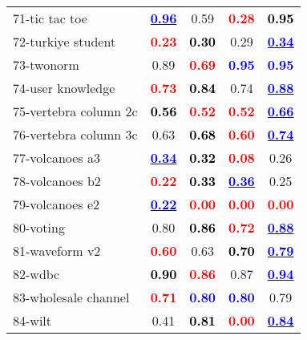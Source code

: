 \begin{table}
\begin{center}
\begin{tabular}{lc|c|c|c}
71-tic tac toe & \underline{\textcolor{blue}{\textbf{  0.96}}} &   0.59 & \textcolor{red}{\textbf{  0.28}} & \textcolor{black}{\textbf{  0.95}} \\
72-turkiye student & \textcolor{red}{\textbf{  0.23}} & \textcolor{black}{\textbf{  0.30}} &   0.29 & \underline{\textcolor{blue}{\textbf{  0.34}}} \\
73-twonorm &   0.89 & \textcolor{red}{\textbf{  0.69}} & \textcolor{blue}{\textbf{  0.95}} & \textcolor{blue}{\textbf{  0.95}} \\
74-user knowledge & \textcolor{red}{\textbf{  0.73}} & \textcolor{black}{\textbf{  0.84}} &   0.74 & \underline{\textcolor{blue}{\textbf{  0.88}}} \\ \hline
75-vertebra column 2c & \textcolor{black}{\textbf{  0.56}} & \textcolor{red}{\textbf{  0.52}} & \textcolor{red}{\textbf{  0.52}} & \underline{\textcolor{blue}{\textbf{  0.66}}} \\
76-vertebra column 3c &   0.63 & \textcolor{black}{\textbf{  0.68}} & \textcolor{red}{\textbf{  0.60}} & \underline{\textcolor{blue}{\textbf{  0.74}}} \\
77-volcanoes a3 & \underline{\textcolor{blue}{\textbf{  0.34}}} & \textcolor{black}{\textbf{  0.32}} & \textcolor{red}{\textbf{  0.08}} &   0.26 \\
78-volcanoes b2 & \textcolor{red}{\textbf{  0.22}} & \textcolor{black}{\textbf{  0.33}} & \underline{\textcolor{blue}{\textbf{  0.36}}} &   0.25 \\
79-volcanoes e2 & \underline{\textcolor{blue}{\textbf{  0.22}}} & \textcolor{red}{\textbf{  0.00}} & \textcolor{red}{\textbf{  0.00}} & \textcolor{red}{\textbf{  0.00}} \\ \hline
80-voting &   0.80 & \textcolor{black}{\textbf{  0.86}} & \textcolor{red}{\textbf{  0.72}} & \underline{\textcolor{blue}{\textbf{  0.88}}} \\
81-waveform v2 & \textcolor{red}{\textbf{  0.60}} &   0.63 & \textcolor{black}{\textbf{  0.70}} & \underline{\textcolor{blue}{\textbf{  0.79}}} \\
82-wdbc & \textcolor{black}{\textbf{  0.90}} & \textcolor{red}{\textbf{  0.86}} &   0.87 & \underline{\textcolor{blue}{\textbf{  0.94}}} \\
83-wholesale channel & \textcolor{red}{\textbf{  0.71}} & \textcolor{blue}{\textbf{  0.80}} & \textcolor{blue}{\textbf{  0.80}} &   0.79 \\
84-wilt &   0.41 & \textcolor{black}{\textbf{  0.81}} & \textcolor{red}{\textbf{  0.00}} & \underline{\textcolor{blue}{\textbf{  0.84}}} \\ \hline

\end{tabular}
\end{center}
\end{table}
